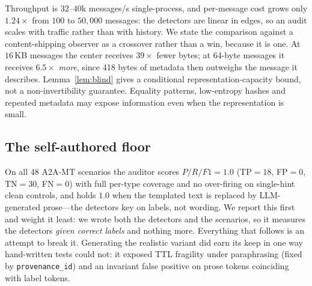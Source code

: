 Throughput is $32$--$40$k messages/s single-process, and per-message cost grows
only $1.24\times$ from $100$ to $50{,}000$ messages: the detectors are linear in
edges, so an audit scales with traffic rather than with history. We state the
comparison against a content-shipping observer as a crossover rather than a win,
because it is one. At $16$\,KB messages the center receives $39\times$ fewer bytes;
at 64-byte messages it receives $6.5\times$ \emph{more}, since 418 bytes of metadata
then outweighs the message it describes. Lemma~\ref{lem:blind} gives a conditional representation-capacity bound, not a
non-invertibility guarantee. Equality patterns, low-entropy hashes and repeated
metadata may expose information even when the representation is small.

\subsection{The self-authored floor}
On all 48 A2A-MT scenarios the auditor scores $P/R/F1=1.0$ (TP$=18$, FP$=0$,
TN$=30$, FN$=0$) with full per-type coverage and no over-firing on single-hint
clean controls, and holds $1.0$ when the templated text is replaced by
LLM-generated prose---the detectors key on labels, not wording. We report this
first and weight it least: we wrote both the detectors and the scenarios, so it
measures the detectors \emph{given correct labels} and nothing more. Everything
that follows is an attempt to break it. Generating the realistic variant did earn
its keep in one way hand-written tests could not: it exposed TTL fragility under
paraphrasing (fixed by \texttt{provenance\_id}) and an invariant false positive on
prose tokens coinciding with label tokens.

